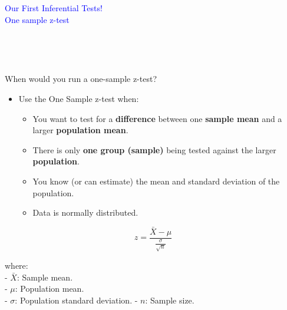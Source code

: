 \documentclass[
  ignorenonframetext,
]{beamer}
\providecommand{\tightlist}{%
  \setlength{\itemsep}{0pt}\setlength{\parskip}{0pt}}
\begin{document}
\begin{frame}{}
\label{section}
\vspace{2cm}
\centering

\textcolor{blue}{Our First Inferential Tests!\\
One sample z-test}\\
\strut \\
\strut \\
\end{frame}

\begin{frame}{When would you run a one-sample z-test?}
\label{when-would-you-run-a-one-sample-z-test}
\begin{itemize}
\tightlist
\item
  Use the One Sample z-test when:

  \begin{itemize}
  \tightlist
  \item
    You want to test for a \textbf{difference} between one
    \textbf{sample mean} and a larger \textbf{population mean}.
  \item
    There is only \textbf{one group (sample)} being tested against the
    larger \textbf{population}.
  \item
    You know (or can estimate) the mean and standard deviation of the
    population.
  \item
    Data is normally distributed.
  \end{itemize}
\end{itemize}

\[
z = \frac{\bar{X} - \mu}{\frac{\sigma}{\sqrt{n}}}
\]

where:\\
- \(\bar{X}\): Sample mean.\\
- \(\mu\): Population mean.\\
- \(\sigma\): Population standard deviation. - \(n\): Sample size.
\end{frame}
\end{document}

